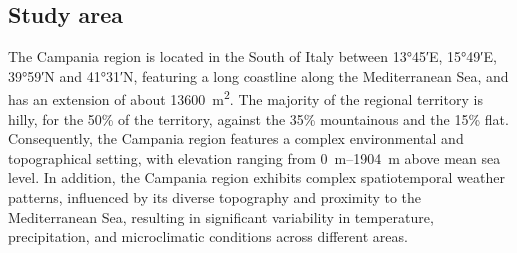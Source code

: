 \documentclass[authoryear,preprint,review,12pt]{elsarticle}
\begin{document}
\subsection{Study area}\label{sec:StudyArea}
The Campania region is located in the South of Italy between \ang{13;45;}E, \ang{15;49;}E, \ang{39;59;}N and \ang{41;31;}N,  %
featuring a long coastline along the Mediterranean Sea, and has an extension of about \SI{13600}{\metre\squared}. %
The majority of the regional territory is hilly, for the 50\% of the territory, against the 35\% mountainous and the 15\% flat.
Consequently, the Campania region features a complex environmental and topographical setting, with elevation ranging from \SIrange{0}{1904}{\metre} above mean sea level.
In addition, the Campania region exhibits complex spatiotemporal weather patterns, influenced by its diverse topography and proximity to the Mediterranean Sea, resulting in significant variability in temperature, precipitation, and microclimatic conditions across different areas.

\end{document}
